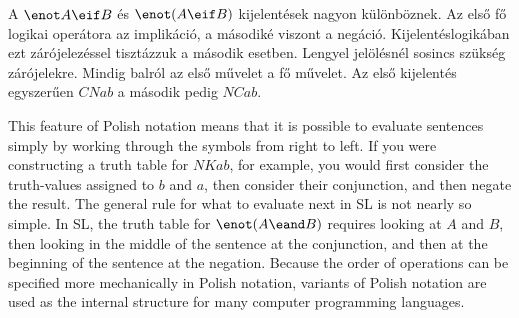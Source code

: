 A $\enot A\eif B$ és $\enot (A\eif B)$ kijelentések nagyon különböznek. Az első fő logikai operátora az implikáció, a másodiké viszont a negáció. Kijelentéslogikában ezt zárójelezéssel tisztázzuk a második esetben. Lengyel jelölésnél sosincs szükség zárójelekre. Mindig balról az első művelet a fő művelet. Az első kijelentés egyszerűen $CNab$ a második pedig $NCab$.



This feature of Polish notation means that it is possible to evaluate sentences simply by working through the symbols from right to left. If you were constructing a truth table for $NKab$, for example, you would first consider the truth-values assigned to $b$ and $a$, then consider their conjunction, and then negate the result. The general rule for what to evaluate next in SL is not nearly so simple. In SL, the truth table for $\enot(A\eand B)$ requires looking at $A$ and $B$, then looking in the middle of the sentence at the conjunction, and then at the beginning of the sentence at the negation. Because the order of operations can be specified more mechanically in Polish notation, variants of Polish notation are used as the internal structure for many computer programming languages.


